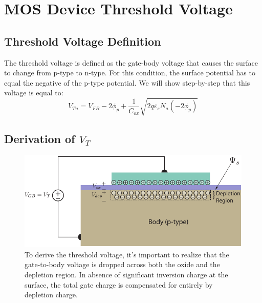 \section{MOS Device Threshold Voltage}
\subsection{Threshold Voltage Definition}
The threshold voltage is defined as the gate-body voltage that causes the surface to change from p-type to n-type.   For this condition, the surface potential has to equal the negative of the p-type potential.  We will show step-by-step that this voltage is equal to:
\begin{equation}
	{V_{Tn}} = {V_{FB}} - 2{\phi _p} + \frac{1}{{{C_{ox}}}}\sqrt {2q{\varepsilon _s}{N_a}( - 2{\phi _p})} 
\end{equation}
\subsection{Derivation of $V_T$}
\begin{figure}[tbh]
\begin{center}
\includegraphics[width=.75\columnwidth]{mos_cap_threshold}
\end{center}
\caption{To derive the threshold voltage, it's important to realize that the gate-to-body voltage is dropped across both the oxide and the depletion region.  In absence of significant inversion charge at the surface, the total gate charge is compensated for entirely by depletion charge.} \label{fig:mos_vt_derive}
\end{figure} 

